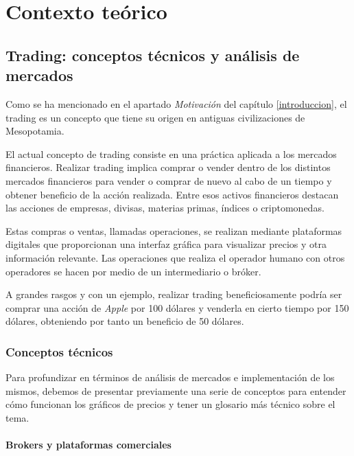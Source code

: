 
\chapter{Contexto teórico}

\section{Trading: conceptos técnicos y análisis de mercados}

Como se ha mencionado en el apartado \textit{Motivación} del capítulo \ref{introduccion}, el trading es un concepto que tiene su origen en antiguas civilizaciones de Mesopotamia. \newline

El actual concepto de trading consiste en una práctica aplicada a los mercados financieros. Realizar trading implica comprar o vender dentro de los distintos mercados financieros para vender o comprar de nuevo al cabo de un tiempo y obtener beneficio de la acción realizada. Entre esos activos financieros destacan las acciones de empresas, divisas, materias primas, índices o criptomonedas. \newline

Estas compras o ventas, llamadas operaciones, se realizan mediante plataformas digitales que proporcionan una interfaz gráfica para visualizar precios y otra información relevante. Las operaciones que realiza el operador humano con otros operadores se hacen por medio de un intermediario o bróker. \newline

A grandes rasgos y con un ejemplo, realizar trading beneficiosamente podría ser comprar una acción de \textit{Apple} por 100 dólares y venderla en cierto tiempo por 150 dólares, obteniendo por tanto un beneficio de 50 dólares. \newline

\subsection{Conceptos técnicos}

Para profundizar en términos de análisis de mercados e implementación de los mismos, debemos de presentar previamente una serie de conceptos para entender cómo funcionan los gráficos de precios y tener un glosario más técnico sobre el tema. \newline

\subsubsection{Brokers y plataformas comerciales}

